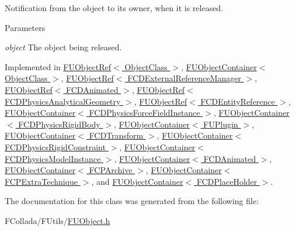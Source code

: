 \label{classFUObjectOwner_a4220f8365226a68c4786b63430966e2d}
Notification from the object to its owner, when it is released. 
\begin{DoxyParams}{Parameters}
\item[{\em object}]The object being released. \end{DoxyParams}


Implemented in \hyperlink{classFUObjectRef_a308359b2fff44b9b63fbc7c8516a1fef}{FUObjectRef$<$ ObjectClass $>$}, \hyperlink{classFUObjectContainer_ac2ab4f1342e3c49e41362a4024fe411b}{FUObjectContainer$<$ ObjectClass $>$}, \hyperlink{classFUObjectRef_a308359b2fff44b9b63fbc7c8516a1fef}{FUObjectRef$<$ FCDExternalReferenceManager $>$}, \hyperlink{classFUObjectRef_a308359b2fff44b9b63fbc7c8516a1fef}{FUObjectRef$<$ FCDAnimated $>$}, \hyperlink{classFUObjectRef_a308359b2fff44b9b63fbc7c8516a1fef}{FUObjectRef$<$ FCDPhysicsAnalyticalGeometry $>$}, \hyperlink{classFUObjectRef_a308359b2fff44b9b63fbc7c8516a1fef}{FUObjectRef$<$ FCDEntityReference $>$}, \hyperlink{classFUObjectContainer_ac2ab4f1342e3c49e41362a4024fe411b}{FUObjectContainer$<$ FCDPhysicsForceFieldInstance $>$}, \hyperlink{classFUObjectContainer_ac2ab4f1342e3c49e41362a4024fe411b}{FUObjectContainer$<$ FCDPhysicsRigidBody $>$}, \hyperlink{classFUObjectContainer_ac2ab4f1342e3c49e41362a4024fe411b}{FUObjectContainer$<$ FUPlugin $>$}, \hyperlink{classFUObjectContainer_ac2ab4f1342e3c49e41362a4024fe411b}{FUObjectContainer$<$ FCDTransform $>$}, \hyperlink{classFUObjectContainer_ac2ab4f1342e3c49e41362a4024fe411b}{FUObjectContainer$<$ FCDPhysicsRigidConstraint $>$}, \hyperlink{classFUObjectContainer_ac2ab4f1342e3c49e41362a4024fe411b}{FUObjectContainer$<$ FCDPhysicsModelInstance $>$}, \hyperlink{classFUObjectContainer_ac2ab4f1342e3c49e41362a4024fe411b}{FUObjectContainer$<$ FCDAnimated $>$}, \hyperlink{classFUObjectContainer_ac2ab4f1342e3c49e41362a4024fe411b}{FUObjectContainer$<$ FCPArchive $>$}, \hyperlink{classFUObjectContainer_ac2ab4f1342e3c49e41362a4024fe411b}{FUObjectContainer$<$ FCPExtraTechnique $>$}, and \hyperlink{classFUObjectContainer_ac2ab4f1342e3c49e41362a4024fe411b}{FUObjectContainer$<$ FCDPlaceHolder $>$}.



The documentation for this class was generated from the following file:\begin{DoxyCompactItemize}
\item 
FCollada/FUtils/\hyperlink{FUObject_8h}{FUObject.h}\end{DoxyCompactItemize}
